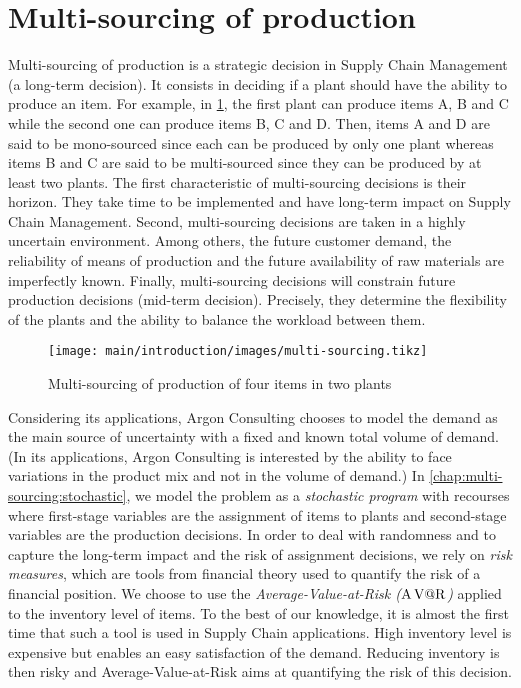 \section{Multi-sourcing of production}
\label{sec:intro:en:multi-sourcing}


Multi-sourcing of production is a strategic decision in Supply Chain Management (\ie a long-term decision).
It consists in deciding if a plant should have the ability to produce an item.
For example, in \cref{fig:intro:en:multi-sourcing}, the first plant can produce items A, B and C while the second one can produce items B, C and D.
Then, items A and D are said to be mono-sourced since each can be produced by only one plant whereas items B and C are said to be multi-sourced since they can be produced by at least two plants.
The first characteristic of multi-sourcing decisions is their horizon.
They take time to be implemented and have long-term impact on Supply Chain Management.
Second, multi-sourcing decisions are taken in a highly uncertain environment.
Among others, the future customer demand, the reliability of means of production and the future availability of raw materials are imperfectly known.
Finally, multi-sourcing decisions will constrain future production decisions (\ie mid-term decision).
Precisely, they determine the flexibility of the plants and the ability to balance the workload between them.


\begin{figure}[!ht]
  \centering
  \texttt{[image: main/introduction/images/multi-sourcing.tikz]}
  \caption{Multi-sourcing of production of four items in two plants}
  \label{fig:intro:en:multi-sourcing}
\end{figure}


Considering its applications, Argon Consulting chooses to model the demand as the main source of uncertainty with a fixed and known total volume of demand.
(In its applications, Argon Consulting is interested by the ability to face variations in the product mix and not in the volume of demand.)
In \cref{chap:multi-sourcing:stochastic}, we model the problem as a \emph{stochastic program} with recourses where first-stage variables are the assignment of items to plants and second-stage variables are the production decisions.
In order to deal with randomness and to capture the long-term impact and the risk of assignment decisions, we rely on \emph{risk measures}, which are tools from financial theory used to quantify the risk of a financial position.
We choose to use the \emph{Average-Value-at-Risk ($\operatorname{A\operatorname{V@R}}$)} applied to the inventory level of items.
To the best of our knowledge, it is almost the first time that such a tool is used in Supply Chain applications.
High inventory level is expensive but enables an easy satisfaction of the demand.
Reducing inventory is then risky and Average-Value-at-Risk aims at quantifying the risk of this decision.


